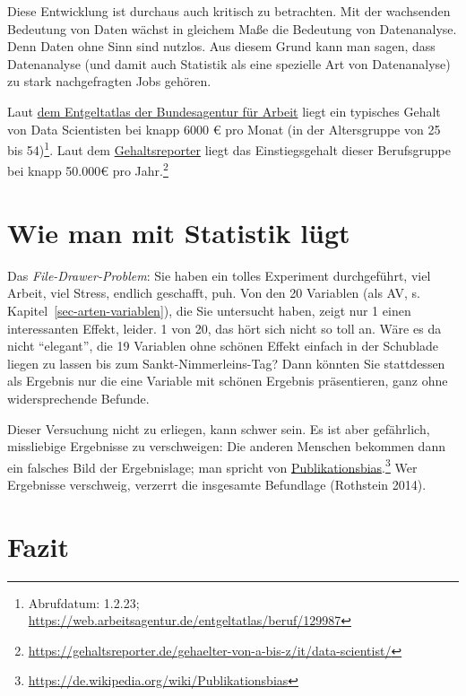 \documentclass[
  a4paper,
  DIV=11]{scrreprt}
\theoremstyle{definition}
\theoremstyle{definition}
\theoremstyle{definition}
\theoremstyle{remark}
\begin{document}
Diese Entwicklung ist durchaus auch kritisch zu betrachten. Mit der
wachsenden Bedeutung von Daten wächst in gleichem Maße die Bedeutung von
Datenanalyse. Denn Daten ohne Sinn sind nutzlos. Aus diesem Grund kann
man sagen, dass Datenanalyse (und damit auch Statistik als eine
spezielle Art von Datenanalyse) zu stark nachgefragten Jobs gehören.

Laut \href{https://web.arbeitsagentur.de/entgeltatlas/beruf/129987}{dem
Entgeltatlas der Bundesagentur für Arbeit} liegt ein typisches Gehalt
von Data Scientisten bei knapp 6000 € pro Monat (in der Altersgruppe von
25 bis 54)\footnote{Abrufdatum: 1.2.23;
  \url{https://web.arbeitsagentur.de/entgeltatlas/beruf/129987}}. Laut
dem
\href{https://gehaltsreporter.de/gehaelter-von-a-bis-z/it/data-scientist/}{Gehaltsreporter}
liegt das Einstiegsgehalt dieser Berufsgruppe bei knapp 50.000€ pro
Jahr.\footnote{\url{https://gehaltsreporter.de/gehaelter-von-a-bis-z/it/data-scientist/}}

\section{Wie man mit Statistik
lügt}\label{wie-man-mit-statistik-luxfcgt}

Das \emph{File-Drawer-Problem}: Sie haben ein tolles Experiment
durchgeführt, viel Arbeit, viel Stress, endlich geschafft, puh. Von den
20 Variablen (als AV, s. Kapitel~\ref{sec-arten-variablen}), die Sie
untersucht haben, zeigt nur 1 einen interessanten Effekt, leider. 1 von
20, das hört sich nicht so toll an. Wäre es da nicht ``elegant'', die 19
Variablen ohne schönen Effekt einfach in der Schublade liegen zu lassen
bis zum Sankt-Nimmerleins-Tag? Dann könnten Sie stattdessen als Ergebnis
nur die eine Variable mit schönen Ergebnis präsentieren, ganz ohne
widersprechende Befunde.

Dieser Versuchung nicht zu erliegen, kann schwer sein. Es ist aber
gefährlich, missliebige Ergebnisse zu verschweigen: Die anderen Menschen
bekommen dann ein falsches Bild der Ergebnislage; man spricht von
\href{https://de.wikipedia.org/wiki/Publikationsbias}{Publikationsbias}.\footnote{\url{https://de.wikipedia.org/wiki/Publikationsbias}}
Wer Ergebnisse verschweig, verzerrt die insgesamte Befundlage (Rothstein
2014).

\section{Fazit}\label{fazit-1}
\end{document}
